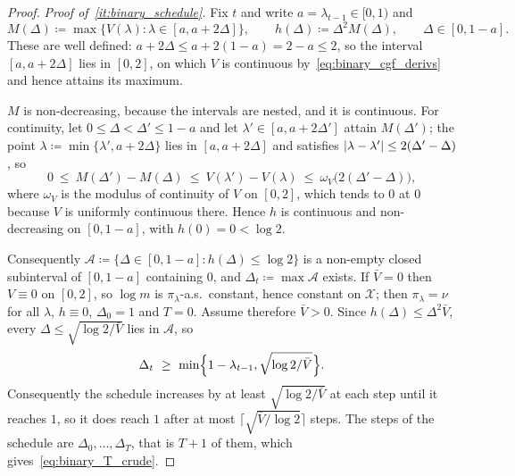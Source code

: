 \documentclass[aos]{imsart}%
\DeclarePairedDelimiter{\abs}{\lvert}{\rvert}
\newcommand{\ambientspace}[0]{\mathcal{X}}
\theoremstyle{plain}
\theoremstyle{definition}
\begin{document}
\begin{proof}
        \emph{Proof of~\ref{it:binary_schedule}.} Fix $t$ and write
        $a=\lambda_{t-1}\in[0,1)$ and
        \begin{equation*}
            M(\Delta)\coloneq\max\bigl\{V(\lambda):
            \lambda\in[a,a+2\Delta]\bigr\},
            \qquad
            h(\Delta)\coloneq\Delta^{2}M(\Delta),
            \qquad \Delta\in[0,1-a].
        \end{equation*}
        These are well defined: $a+2\Delta\leq a+2(1-a)=2-a\leq2$, so the
        interval $[a,a+2\Delta]$ lies in $[0,2]$, on which $V$ is continuous
        by~\eqref{eq:binary_cgf_derivs} and hence attains its maximum.

        $M$ is non-decreasing, because the intervals are nested, and it is
        continuous. For continuity, let $0\leq\Delta<\Delta'\leq1-a$ and let
        $\lambda'\in[a,a+2\Delta']$ attain $M(\Delta')$; the point
        $\lambda\coloneq\min\{\lambda',a+2\Delta\}$ lies in $[a,a+2\Delta]$
        and satisfies $\abs{\lambda-\lambda'}\leq2(\Delta'-\Delta)$, so
        \begin{equation*}
            0\ \leq\ M(\Delta')-M(\Delta)\ \leq\ V(\lambda')-V(\lambda)
            \ \leq\ \omega_V\bigl(2(\Delta'-\Delta)\bigr),
        \end{equation*}
        where $\omega_V$ is the modulus of continuity of $V$ on $[0,2]$, which
        tends to $0$ at $0$ because $V$ is uniformly continuous there. Hence
        $h$ is continuous and non-decreasing on $[0,1-a]$, with $h(0)=0<\log2$.

        Consequently $\mathcal{A}\coloneq\{\Delta\in[0,1-a]:h(\Delta)\leq
        \log2\}$ is a non-empty closed subinterval of $[0,1-a]$ containing
        $0$, and $\Delta_t\coloneq\max\mathcal{A}$ exists. If $\bar V=0$ then
        $V\equiv0$ on $[0,2]$, so $\log m$ is $\pi_\lambda$-a.s.\ constant,
        hence constant on $\ambientspace$; then $\pi_\lambda=\nu$ for all
        $\lambda$, $h\equiv0$, $\Delta_0=1$ and $T=0$. Assume therefore
        $\bar V>0$. Since $h(\Delta)\leq\Delta^{2}\bar V$, every
        $\Delta\leq\sqrt{\log2/\bar V}$ lies in $\mathcal{A}$, so
        \begin{equation}
            \label{eq:binary_delta_lower}
            \Delta_t\ \geq\ \min\Bigl\{1-\lambda_{t-1},
            \sqrt{\log2/\bar V}\Bigr\} .
        \end{equation}
        Consequently the schedule increases by at least
        $\sqrt{\log2/\bar V}$ at each step until it reaches $1$, so it does
        reach $1$ after at most $\lceil\sqrt{\bar V/\log2}\rceil$ steps. The
        steps of the schedule are $\Delta_0,\dots,\Delta_T$, that is $T+1$ of
        them, which gives~\eqref{eq:binary_T_crude}.


\end{proof}
\end{document}
